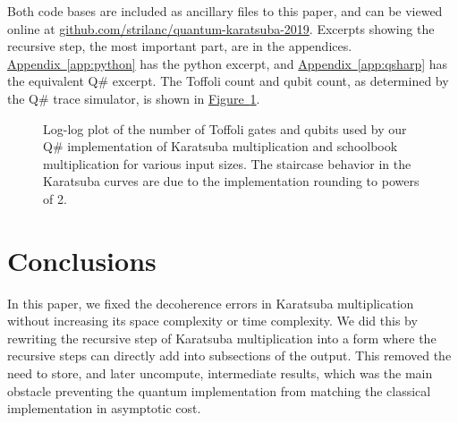 \documentclass[onecolumn]{quantumarticle}
\DeclareRobustCommand{\app}[1]{\hyperref[app:#1]{Appendix~\ref*{app:#1}}}
\newcommand{\fig}[1]{\hyperref[fig:#1]{Figure~\ref*{fig:#1}}}
\begin{document}
Both code bases are included as ancillary files to this paper, and can be viewed online at \href{https://github.com/strilanc/quantum-karatsuba-2019}{github.com/strilanc/quantum-karatsuba-2019}.
Excerpts showing the recursive step, the most important part, are in the appendices.
\app{python} has the python excerpt, and \app{qsharp} has the equivalent Q\# excerpt.
The Toffoli count and qubit count, as determined by the Q\# trace simulator, is shown in \fig{data}.

\begin{figure}
    \centering
    \caption{
    \label{fig:data}
    Log-log plot of the number of Toffoli gates and qubits used by our Q\# implementation of Karatsuba multiplication and schoolbook multiplication for various input sizes.
    The staircase behavior in the Karatsuba curves are due to the implementation rounding to powers of 2.
    }
\end{figure}

\section{Conclusions}
\label{sec:conclusion}

In this paper, we fixed the decoherence errors in Karatsuba multiplication without increasing its space complexity or time complexity.
We did this by rewriting the recursive step of Karatsuba multiplication into a form where the recursive steps can directly add into subsections of the output.
This removed the need to store, and later uncompute, intermediate results, which was the main obstacle preventing the quantum implementation from matching the classical implementation in asymptotic cost.
\end{document}
